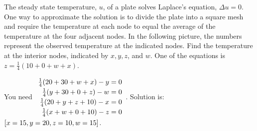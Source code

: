 \begin{ex}
  The steady state temperature, $u$, of a plate solves Laplace's
  equation, $\Delta u=0$. One way to approximate the solution is to divide the plate into a square mesh and require the temperature
  at each node to equal the average of the temperature at the four adjacent
  nodes. In the following picture, the numbers represent the observed
  temperature at the indicated nodes. Find the temperature at
  the interior nodes, indicated by $x,y,z$, and $w$. One of the equations is
  $z=\frac{1}{4}(10+0+w+x)$.

  \begin{center}
  \end{center}
  \begin{sol}
    You need $\def\arraystretch{1.2}
    \begin{array}{r}
      \frac{1}{4}(20+30+w+x) -y=0 \\
      \frac{1}{4}(y+30+0+z) -w=0 \\
      \frac{1}{4}(20+y+z+10) -x=0 \\
      \frac{1}{4}(x+w+0+10) -z=0
    \end{array}
    $. Solution is: $\left[x=15,y=20,z=10,w=15\right]$.
  \end{sol}
\end{ex}

